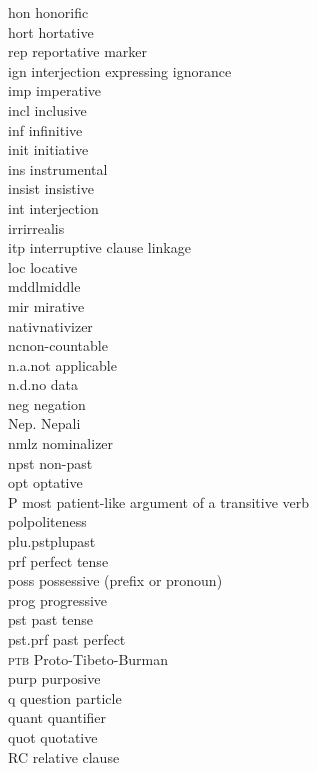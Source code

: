 \begin{refsection}
{\begin{tabbing}
{\sc hon}\> honorific\\
{\sc hort} \> hortative\\
{\sc rep}\> reportative marker\\
{\sc ign}\>  interjection expressing ignorance\\
{\sc imp} \> imperative\\
{\sc incl}\> inclusive\\
{\sc inf} \> infinitive\\
{\sc init} \> initiative\\
{\sc ins} \> instrumental\\
{\sc insist} \> insistive\\
{\sc int} \> interjection\\
{\sc irr}\>irrealis\\
{\sc itp} \> interruptive clause linkage\\
{\sc loc} 	 \> locative \\
{\sc mddl}\>middle\\
{\sc mir} \> mirative\\
{\sc nativ}\>nativizer\\
{\sc nc}\>non-countable\\
n.a.\>not applicable\\
n.d.\>no data\\
{\sc neg} \>	negation\\
Nep. \>	Nepali\\
{\sc nmlz} \>	nominalizer\\
{\sc npst} \> non-past\\
{\sc opt} \> optative\\
P 	\> most patient-like argument of a transitive verb\\
{\sc pol}\>politeness\\
{\sc plu.pst}\>plupast\\
{\sc prf}\> perfect tense\\
{\sc poss} \> possessive (prefix or pronoun)\\
{\sc prog} \> progressive\\
{\sc pst} \> past tense\\
{\sc pst.prf} \> past perfect\\
\textsc{ptb} \> Proto-Tibeto-Burman\\
{\sc purp}\> purposive\\
{\sc q} \> question particle\\
{\sc quant} \> quantifier\\
{\sc quot} \> quotative\\
{\sc RC} \> relative clause\\

\end{tabbing}}
\end{refsection}
